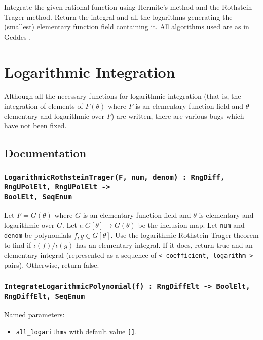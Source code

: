 \documentclass{article}
\theoremstyle{plain}
\theoremstyle{definition}
\begin{document}
Integrate the given rational function using Hermite's method and the
Rothstein-Trager method. Return the integral and all the logarithms
generating the (smallest) elementary function field containing it. All
algorithms used are as in Geddes \cite{geddes:afca}.

\section{Logarithmic Integration} \label{sec:log_int}

Although all the necessary functions for logarithmic integration (that is,
the integration of elements of $F(\theta)$ where $F$ is an elementary function
field and $\theta$ elementary and logarithmic over $F$) are written, there are
various bugs which have not been fixed.

\subsection{Documentation}

\subsubsection*{\texttt{LogarithmicRothsteinTrager(F, num, denom) : RngDiff, RngUPolElt, RngUPolElt ->\\BoolElt, SeqEnum}}

Let $F = G(\theta)$ where $G$ is an elementary function field and $\theta$ is
elementary and logarithmic over $G$. Let $\iota : G[\theta] \to G(\theta)$ be
the inclusion map. Let \lstinline{num} and \lstinline{denom} be polynomials
$f,g \in G[\theta]$. Use the logarithmic Rothstein-Trager theorem to find if
$\iota(f)/\iota(g)$ has an elementary integral. If it does, return true and an
elementary integral (represented as a sequence of
\lstinline{< coefficient, logarithm >} pairs). Otherwise, return false.

\subsubsection*{\lstinline{IntegrateLogarithmicPolynomial(f) : RngDiffElt -> BoolElt, RngDiffElt, SeqEnum}}

Named parameters:
\begin{itemize}
    \item[] \lstinline{all_logarithms} with default value \lstinline{[]}.
\end{itemize}
\end{document}
